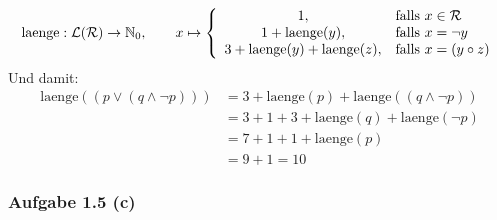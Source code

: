 \begin{lösung}
	\begin{align*}
		\text{laenge}:\mathcal{L}(\mathcal{R})\to\mathbb{N}_0,\qquad x\mapsto \left\lbrace\begin{array}{cl}
			1, & \text{falls } x\in\mathcal{R}\\
			1+\text{laenge}(y), & \text{falls } x=\neg y\\
			3+\text{laenge}(y)+\text{laenge}(z), & \text{falls } x=(y\circ z)
		\end{array}\right.
	\end{align*}
	Und damit:
	\begin{align*}
		\text{laenge}((p\vee(q\wedge\neg p))) 
		&=3+\text{laenge}(p)+\text{laenge}((q\wedge\neg p))\\
		&=3+1+3+\text{laenge}(q)+\text{laenge}(\neg p)\\
		&=7 + 1 + 1+ \text{laenge}(p)\\
		&=9+1=10
	\end{align*}
\end{lösung}

\subsubsection{Aufgabe 1.5 (c)}

